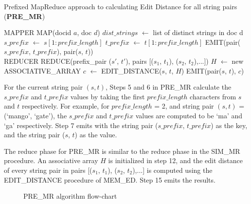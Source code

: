 \documentclass[conference]{IEEEtran}
\begin{document}
\begin{algorithm}
\caption{Prefixed MapReduce approach to calculating Edit Distance for all string pairs (\textbf{PRE\_MR})}
\begin{algorithmic}[1]
\class MAPPER
    \method MAP(docid $a$, doc $d$)
        \State $dist\_strings$ $\leftarrow$ list of distinct strings in doc d
            \State $s\_prefix$ $\leftarrow$ $s[1: prefix\_length]$
            \State $t\_prefix$ $\leftarrow$ $t[1: prefix\_length]$
            \State EMIT(pair($s\_prefix$, $t\_prefix$), pair($s$, $t$))
        \EndFor
    \endmethod
\endclass\\

\class REDUCER
    \method REDUCE(prefix\_pair ($s'$, $t'$), pairs [($s_1$, $t_1$), ($s_2$, $t_2$),...])
        \State $H$ $\leftarrow$ new ASSOCIATIVE\_ARRAY
            \State $c$ $\leftarrow$ EDIT\_DISTANCE($s$, $t$, $H$)
            \State EMIT(pair($s$, $t$), $c$)
        \EndFor
    \endmethod
\endclass

\end{algorithmic}
\end{algorithm}

For the current string pair $(s, t)$, Steps 5 and 6 in PRE\_MR calculate the $s\_prefix$ and $t\_prefix$ values by taking the first $prefix\_length$ characters from $s$ and $t$ respectively. For example, for $prefix\_length$ = 2, and string pair $(s, t)$ = (`mango', `gate'), the $s\_prefix$ and $t\_prefix$ values are computed to be `ma' and `ga' respectively. Step 7 emits with the string pair ($s\_prefix$, $t\_prefix$) as the key, and the string pair ($s$, $t$) as the value.

The reduce phase for PRE\_MR is similar to the reduce phase in the SIM\_MR procedure. An associative array $H$ is initialized in step 12, and the edit distance of every string pair in pairs [($s_1$, $t_1$), ($s_2$, $t_2$),...] is computed using the EDIT\_DISTANCE procedure of MEM\_ED. Step 15 emits the results.

\begin{figure*}[htbp]
\begin{center}
\setlength\fboxsep{0pt}
\setlength\fboxrule{0.25pt}
\end{center}
\caption{PRE\_MR algorithm flow-chart}
\label{fig:pre_mr_flow}
\end{figure*}
\end{document}
